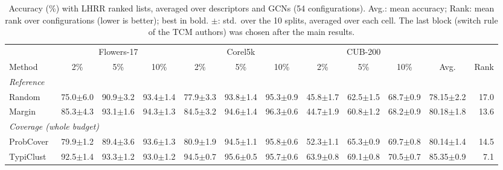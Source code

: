 \begin{table}[t]
\centering
\caption{Accuracy (\%) with LHRR ranked lists, averaged over descriptors and GCNs (54 configurations). Avg.: mean accuracy; Rank: mean rank over configurations (lower is better); best in bold. $\pm$: std.\ over the 10 splits, averaged over each cell. The last block (switch rule of the TCM authors) was chosen after the main results.}
\label{tab:sota-lhrr-std}
\footnotesize
\setlength{\tabcolsep}{3.5pt}
\begin{adjustbox}{max width=\textwidth}
\begin{tabular}{lrrrrrrrrrrr}
\toprule
& \multicolumn{3}{c}{Flowers-17} & \multicolumn{3}{c}{Corel5k} & \multicolumn{3}{c}{CUB-200} & & \\
\cmidrule(lr){2-4}\cmidrule(lr){5-7}\cmidrule(lr){8-10}
Method & \multicolumn{1}{c}{2\%} & \multicolumn{1}{c}{5\%} & \multicolumn{1}{c}{10\%} & \multicolumn{1}{c}{2\%} & \multicolumn{1}{c}{5\%} & \multicolumn{1}{c}{10\%} & \multicolumn{1}{c}{2\%} & \multicolumn{1}{c}{5\%} & \multicolumn{1}{c}{10\%} & \multicolumn{1}{c}{Avg.} & \multicolumn{1}{c}{Rank} \\
\midrule
\multicolumn{12}{l}{\textit{Reference}} \\
\quad Random & 75.0{\scriptsize$\pm$6.0} & 90.9{\scriptsize$\pm$3.2} & 93.4{\scriptsize$\pm$1.4} & 77.9{\scriptsize$\pm$3.3} & 93.8{\scriptsize$\pm$1.4} & 95.3{\scriptsize$\pm$0.9} & 45.8{\scriptsize$\pm$1.7} & 62.5{\scriptsize$\pm$1.5} & 68.7{\scriptsize$\pm$0.9} & 78.15{\scriptsize$\pm$2.2} & 17.0 \\
\quad Margin~\cite{scheffer2001active} & 85.3{\scriptsize$\pm$4.3} & 93.1{\scriptsize$\pm$1.6} & 94.3{\scriptsize$\pm$1.3} & 84.5{\scriptsize$\pm$3.2} & 94.6{\scriptsize$\pm$1.4} & 96.3{\scriptsize$\pm$0.6} & 44.7{\scriptsize$\pm$1.9} & 60.8{\scriptsize$\pm$1.2} & 68.2{\scriptsize$\pm$0.9} & 80.18{\scriptsize$\pm$1.8} & 13.6 \\
\multicolumn{12}{l}{\textit{Coverage (whole budget)}} \\
\quad ProbCover~\cite{yehuda2022active} & 79.9{\scriptsize$\pm$1.2} & 89.4{\scriptsize$\pm$3.6} & 93.6{\scriptsize$\pm$1.3} & 80.9{\scriptsize$\pm$1.9} & 94.5{\scriptsize$\pm$1.1} & 95.8{\scriptsize$\pm$0.6} & 52.3{\scriptsize$\pm$1.1} & 65.3{\scriptsize$\pm$0.9} & 69.7{\scriptsize$\pm$0.8} & 80.14{\scriptsize$\pm$1.4} & 14.5 \\
\quad TypiClust~\cite{hacohen2022active} & 92.5{\scriptsize$\pm$1.4} & 93.3{\scriptsize$\pm$1.2} & 93.0{\scriptsize$\pm$1.2} & 94.5{\scriptsize$\pm$0.7} & 95.6{\scriptsize$\pm$0.5} & 95.7{\scriptsize$\pm$0.6} & 63.9{\scriptsize$\pm$0.8} & 69.1{\scriptsize$\pm$0.8} & 70.5{\scriptsize$\pm$0.7} & 85.35{\scriptsize$\pm$0.9} & 7.1 \\

\end{tabular}
\end{adjustbox}
\end{table}
